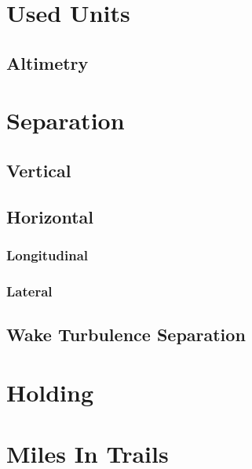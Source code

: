 \section{Used Units}
\subsection{Altimetry}

\section{Separation}
\subsection{Vertical}
\subsection{Horizontal}
\subsubsection{Longitudinal}
\subsubsection{Lateral}
\subsection{Wake Turbulence Separation}

\section{Holding}

\section{Miles In Trails}




